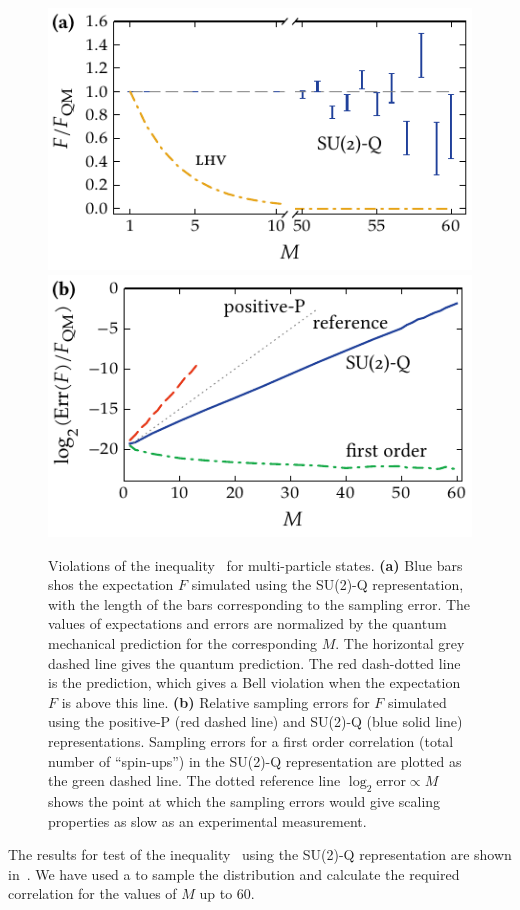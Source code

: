 \begin{figure}
    \centerline{%
    \includegraphics{figures_generated/bell/ghz_violations.pdf}%
    \includegraphics{figures_generated/bell/ghz_errors.pdf}}

    \caption{
    Violations of the inequality~ for multi-particle  states.
    \textbf{(a)} Blue bars shos the expectation $F$ simulated using the SU(2)-Q representation, with the length of the bars corresponding to the sampling error.
    The values of expectations and errors are normalized by the quantum mechanical prediction for the corresponding $M$.
    The horizontal grey dashed line gives the quantum prediction.
    The red dash-dotted line is the  prediction, which gives a Bell violation when the expectation $F$ is above this line.
    \textbf{(b)} Relative sampling errors for $F$ simulated using the positive-P (red dashed line) and SU(2)-Q (blue solid line) representations.
    Sampling errors for a first order correlation (total number of ``spin-ups'') in the SU(2)-Q representation are plotted as the green dashed line.
    The dotted reference line $\log_2 \mathrm{error} \propto M$ shows the point at which the sampling errors would give scaling properties as slow as an experimental measurement.}

    \label{fig:bell-ineq:ghz:violation}
\end{figure}

The results for test of the inequality~ using the SU(2)-Q representation are shown in~.
We have used a  to sample the distribution and calculate the required correlation for the values of $M$ up to $60$.
